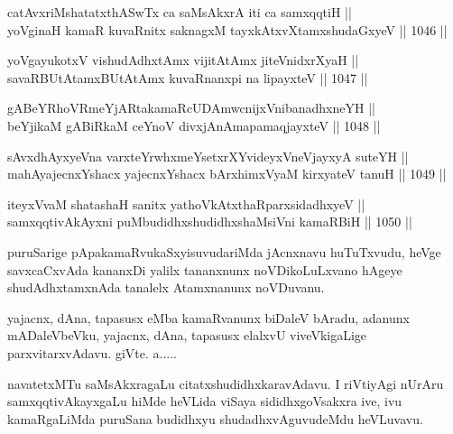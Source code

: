 \begin{shl}
catAvxriMshatatxthA\s SwTx ca saMsAkxrA iti ca samxqqtiH || \\
yoVginaH kamaR kuvaRnitx saknagxM tayxkAtxvX\s \s tamxshudaGxyeV \hfill || 1046 ||  
\end{shl}
				
\begin{shl}
yoVgayukotxV vishudAdhxtAmx vijitAtAmx jiteVnidxrXyaH || \\
savaRBUtAtamxBUtAtAmx kuvaRnanxpi na lipayxteV \hfill || 1047 ||  
\end{shl}
				
\begin{shl}
gABeYRhoVRmeYjARtakamaRcUDAmwcnijxVnibanadhxneYH || \\
beYjikaM gABiRkaM ceYnoV divxjAnAmapamaqjayxteV \hfill || 1048 ||  
\end{shl}
				
\begin{shl}
sAvxdhAyxyeVna varxteYrwhxmeYsetxrXYvideyxVneVjayxyA suteYH || \\
mahAyajecnxYshacx yajecnxYshacx bArxhimxVyaM kirxyateV tanuH \hfill || 1049 ||  
\end{shl}
				
\begin{shl}
iteyxVvaM shatashaH sanitx yathoVkAtxthaRparxsidadhxyeV ||  \\
samxqqtivAkAyxni puMbudidhxshudidhxshaMsiVni kamaRBiH \hfill || 1050 ||  
\end{shl}

\begin{artha}
puruSarige pApakamaRvukaSxyisuvudariMda jAcnxnavu huTuTxvudu, heVge savxcaCxvAda kananxDi yalilx tananxnunx noVDikoLuLxvano hAgeye shudAdhxtamxnAda  tanalelx Atamxnanunx noVDuvanu.
\end{artha}

\begin{artha}
yajacnx, dAna, tapasusx eMba kamaRvanunx biDaleV bAradu, adanunx mADaleVbeVku, yajacnx, dAna, tapasusx elalxvU viveVkigaLige parxvitarxvAdavu. giVte. a.....
\end{artha}

\begin{artha}
navatetxMTu saMsAkxragaLu citatxshudidhxkaravAdavu. I riVtiyAgi nUrAru samxqqtivAkayxgaLu hiMde heVLida viSaya sididhxgoVsakxra ive, ivu kamaRgaLiMda puruSana budidhxyu shudadhxvAguvudeMdu heVLuvavu.
\end{artha}


